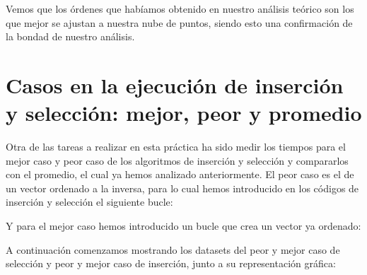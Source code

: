 \documentclass[10pt,a4paper]{article}
\begin{document}
Vemos que los órdenes que habíamos obtenido en nuestro análisis teórico son los que mejor se ajustan a nuestra nube de puntos, siendo esto una confirmación de la bondad de nuestro análisis.

\section{Casos en la ejecución de inserción y selección: mejor, peor y promedio}

Otra de las tareas a realizar en esta práctica ha sido medir los tiempos para el mejor caso y peor caso de los algoritmos de inserción y selección y compararlos con el promedio, el cual ya hemos analizado anteriormente. El peor caso es el de un vector ordenado a la inversa, para lo cual hemos introducido en los códigos de inserción y selección el siguiente bucle:



Y para el mejor caso hemos introducido un bucle que crea un vector ya ordenado:



A continuación comenzamos mostrando los datasets del peor y mejor caso de selección y peor y mejor caso de inserción, junto a su representación gráfica:

\newpage

\begin{table}[h!]
	\centering
	\footnotesize
	\hspace{2cm}
	\hspace{2cm}
	\caption{Datasets de la ejecución del peor caso para Selección}
\end{table}
\end{document}
